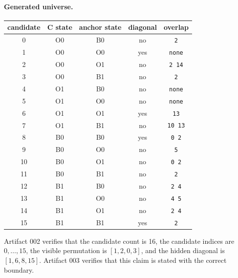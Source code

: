 \paragraph{Generated universe.}
\begin{center}
\begin{tabular}{c|c|c|c|c}
candidate & C state & anchor state & diagonal & overlap\\
\hline
0 & O0 & B0 & no & \texttt{2} \\
1 & O0 & O0 & yes & \texttt{none} \\
2 & O0 & O1 & no & \texttt{2 14} \\
3 & O0 & B1 & no & \texttt{2} \\
4 & O1 & B0 & no & \texttt{none} \\
5 & O1 & O0 & no & \texttt{none} \\
6 & O1 & O1 & yes & \texttt{13} \\
7 & O1 & B1 & no & \texttt{10 13} \\
8 & B0 & B0 & yes & \texttt{0 2} \\
9 & B0 & O0 & no & \texttt{5} \\
10 & B0 & O1 & no & \texttt{0 2} \\
11 & B0 & B1 & no & \texttt{2} \\
12 & B1 & B0 & no & \texttt{2 4} \\
13 & B1 & O0 & no & \texttt{4 5} \\
14 & B1 & O1 & no & \texttt{2 4} \\
15 & B1 & B1 & yes & \texttt{2} \\
\end{tabular}
\end{center}

Artifact 002 verifies that the candidate count is 16, the candidate indices are \(0,\ldots,15\), the visible permutation is \([1,2,0,3]\), and the hidden diagonal is \([1,6,8,15]\).  Artifact 003 verifies that this claim is stated with the correct boundary.
